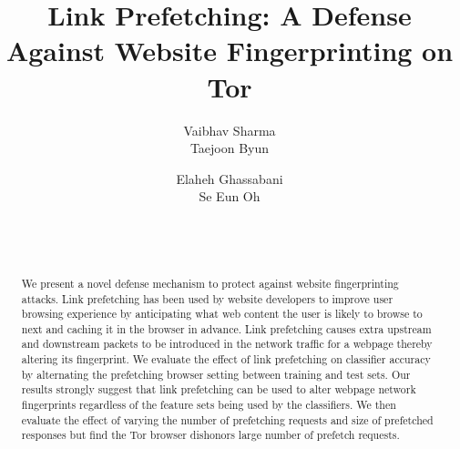 \documentclass{sig-alternate-05-2015}
\begin{document}
\title{Link Prefetching: A Defense Against Website Fingerprinting on Tor }

\author{
    \alignauthor
        Vaibhav Sharma\\%
    \alignauthor
        Taejoon Byun\\
\and
    \alignauthor
        Elaheh Ghassabani\\
    \alignauthor
        Se Eun Oh\\%
\and
      \\
           \\
}

\maketitle
\begin{abstract}
We present a novel defense mechanism to protect against website fingerprinting attacks. 
Link prefetching has been used by website developers to improve user browsing experience by anticipating what web content the user is likely to browse to next and caching it in the browser in advance. 
Link prefetching causes extra upstream and downstream packets to be introduced in the network traffic for a webpage thereby altering its fingerprint. 
We evaluate the effect of link prefetching on classifier accuracy by alternating the prefetching browser setting between training and test sets. Our results strongly suggest that link prefetching can be used to alter webpage network fingerprints regardless of the feature sets being used by the classifiers. 
We then evaluate the effect of varying the number of prefetching requests and size of prefetched responses but find the Tor browser dishonors large number of prefetch requests. 

\end{abstract}

\end{document}
